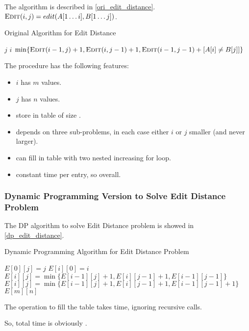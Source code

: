 The algorithm is described in \cref{ori_edit_distance}.
$\textsc{Edit} (i, j) = edit(A[1 \ldots i], B[1 \ldots j])$.

\begin{algorithm}[H]
    \caption{Original Algorithm for Edit Distance}\label{ori_edit_distance}
    \begin{algorithmic}
                \Return $j$
            \EndIf
                \Return $i$
            \EndIf
            \Return $\min\{\textsc{Edit} (i-1,j)+1,\textsc{Edit} (i,j-1)+1,\textsc{Edit} (i-1,j-1)+[A[i]\neq B[j]]\}$
        \EndProcedure
    \end{algorithmic}
\end{algorithm}

\observation

The procedure  has the following features:

\begin{itemize}
    \item $i$ has $m$ values.
    \item $j$ has $n$ values.
    \item store in table of size .
    \item {} depends on three sub-problems,
        in each case either $i$ or $j$ smaller (and never larger).
    \item can fill in table with two nested increasing for loop.
    \item constant time per entry, so  overall.
\end{itemize}

\subsubsection{Dynamic Programming Version to Solve Edit Distance Problem}

The DP algorithm to solve Edit Distance problem is showed in \cref{dp_edit_distance}.

\begin{algorithm}[H]
\caption{Dynamic Programming Algorithm for Edit Distance Problem}\label{dp_edit_distance}
\begin{algorithmic}[1]
            \State $E[0][j]=j$
        \EndFor
            \State $E[i][0]=i$
        \EndFor
                    \State $E[i][j] = \min\{E[i-1][j]+1, E[i][j-1]+1, E[i-1][j-1]\}$
                \Else
                    \State $E[i][j] = \min\{E[i-1][j]+1, E[i][j-1]+1, E[i-1][j-1]+1\}$
                \EndIf
            \EndFor
        \EndFor
        \Return $E[m][n]$
    \EndProcedure
\end{algorithmic}
\end{algorithm}

The operation to fill the table takes  time, ignoring recursive calls.

So, total time is obviously .
